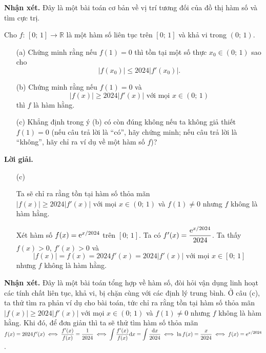 \textbf{Nhận xét. }Đây là một bài toán cơ bản về vị trí tương đối của đồ thị hàm số và tìm cực trị.

\begin{tcolorbox}[title=\textbf{Bài toán B.4.},breakable]
    Cho $f:\,[0;\,1] \to \mathbb{R}$ là một hàm số liên tục trên $[0;\,1]$ và khả vi trong $(0;\,1)$.

    \begin{enumerate}
        \item[(a)] {Chứng minh rằng nếu $f(1) = 0$ thì tồn tại một số thực $x_0 \in (0;\,1)$ sao cho $$|f(x_0)| \leq 2024|f'(x_0)|.$$}
        \item[(b)] {Chứng minh rằng nếu $f(1) = 0$ và $$|f(x)| \geq 2024|f'(x)|\text{ với mọi }x \in (0;\,1)$$ thì $f$ là hàm hằng.}
        \item[(c)] {Khẳng định trong ý (b) có còn đúng không nếu ta không giả thiết $f(1) = 0$ (nếu câu trả lời là ``có'', hãy chứng minh; nếu câu trả lời là ``không'', hãy chỉ ra ví dụ về một hàm số $f$)?}  
    \end{enumerate}
\end{tcolorbox}

\textbf{Lời giải. }

\begin{enumerate}
    \item[(c)] {Ta sẽ chỉ ra rằng tồn tại hàm số thỏa mãn $|f(x)| \geq 2024|f'(x)|\text{ với mọi }x \in (0;\,1)$ và $f(1) \ne 0$ nhưng $f$ không là hàm hằng.
    
    Xét hàm số $f(x) = {\rm e}^{x/2024}$ trên $[0;\,1]$. Ta có $f'(x) = \dfrac{{\rm e}^{x/2024}}{2024}$. Ta thấy $f(x) > 0,\,f'(x) > 0$ và $$|f(x)| = f(x) = 2024f'(x) = 2024|f'(x)|\text{ với mọi }x \in [0;\,1]$$ nhưng $f$ không là hàm hằng.} 
\end{enumerate}

\textbf{Nhận xét. }Đây là một bài toán tổng hợp về hàm số, đòi hỏi vận dụng linh hoạt các tính chất liên tục, khả vi, bị chặn cùng với các định lý trung bình. Ở câu (c), ta thử tìm ra phản ví dụ cho bài toán, tức chỉ ra rằng tồn tại hàm số thỏa mãn $|f(x)| \geq 2024|f'(x)|\text{ với mọi }x \in (0;\,1)$ và $f(1) \ne 0$ nhưng $f$ không là hàm hằng. Khi đó, để đơn giản thì ta sẽ thử tìm hàm số thỏa mãn $f(x) = 2024f'(x) \iff \dfrac{f'(x)}{f(x)} = \dfrac{1}{2024} \iff \displaystyle\int\dfrac{f'(x)}{f(x)}\mathrm{d}x = \displaystyle\int\dfrac{\mathrm{d}x}{2024} \iff \ln f(x) = \dfrac{x}{2024} \iff f(x) = {\rm e}^{x/2024}$. 

